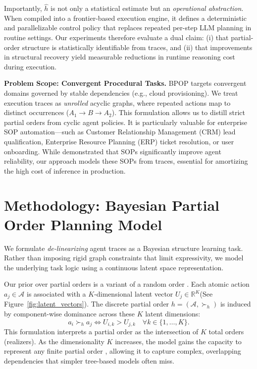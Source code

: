 \documentclass{article}
\theoremstyle{plain}
\theoremstyle{definition}
\theoremstyle{remark}
\begin{document}
Importantly, $\widehat{h}$ is not only a statistical estimate but an \emph{operational abstraction}.
When compiled into a frontier-based execution engine, it defines a deterministic and parallelizable control policy
that replaces repeated per-step LLM planning in routine settings.
Our experiments therefore evaluate a dual claim: (i) that partial-order structure is statistically identifiable from traces,
and (ii) that improvements in structural recovery yield measurable reductions in runtime reasoning cost during execution.

\noindent \textbf{Problem Scope: Convergent Procedural Tasks.}
BPOP targets convergent domains governed by stable dependencies (e.g., cloud provisioning). We treat execution traces as \emph{unrolled} acyclic graphs, where repeated actions map to distinct occurrences ($A_1 \to B \to A_2$). This formulation allows us to distill strict partial orders from cyclic agent policies. It is particularly valuable for enterprise SOP automation---such as Customer Relationship Management (CRM) lead qualification, Enterprise Resource Planning (ERP) ticket resolution, or user onboarding. While \citet{hong2024metagpt} demonstrated that SOPs significantly improve agent reliability, our approach models these SOPs from traces, essential for amortizing the high cost of inference in production.

\section{Methodology: Bayesian Partial Order Planning Model}
\label{sec:po-model}


We formulate \emph{de-linearizing} agent traces as a Bayesian structure learning task. Rather than imposing rigid graph constraints that limit expressivity, we model the underlying task logic using a continuous latent space representation.

Our prior over partial orders is a variant \citep{nicholls2024bayesianinferencepartialorders} of a random order \citep{winkler1985random}. Each atomic action $a_j \in \mathcal{A}$ is associated with a $K$-dimensional latent vector $U_{j} \in \mathbb{R}^K$(See Figure~\ref{fig:latent_vectors}). The discrete partial order $h = (\mathcal{A}, \succ_h)$ is induced by component-wise dominance across these $K$ latent dimensions:
  \vspace{-1em}
\begin{equation}
    a_i \succ_h a_j \iff U_{i,k} > U_{j,k} \quad \forall k \in \{1, \dots, K\}.
\end{equation}
This formulation interprets a partial order as the intersection of $K$ total orders (realizers). As the dimensionality $K$ increases, the model gains the capacity to represent any finite partial order \citep{dushnik1941partially}, allowing it to capture complex, overlapping dependencies that simpler tree-based models often miss. 
\end{document}
